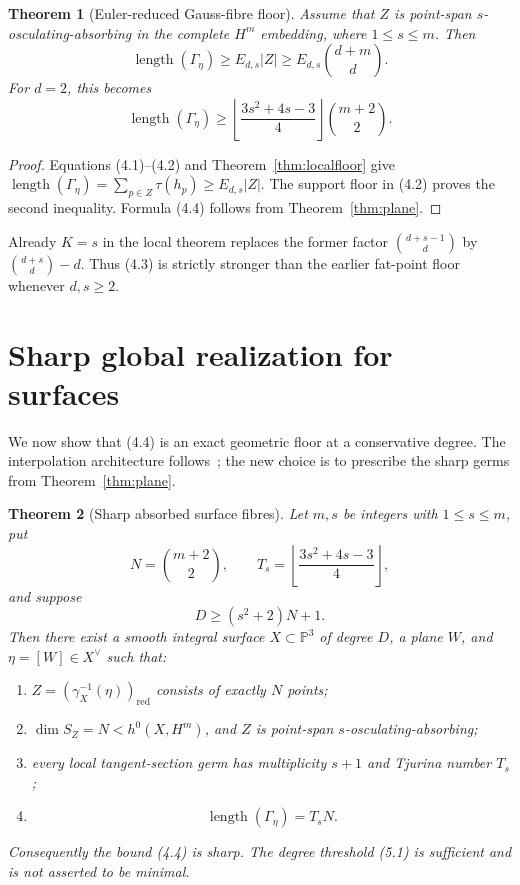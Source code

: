 \documentclass[11pt,a4paper]{article}
\newtheorem{theorem}{Theorem}[section]
\theoremstyle{definition}
\numberwithin{equation}{section}
\newcommand{\PP}{\mathbb P}
\newcommand{\length}{\operatorname{length}}
\begin{document}
\begin{theorem}[Euler-reduced Gauss-fibre floor]\label{thm:gauss}
Assume that \(Z\) is point-span \(s\)-osculating-absorbing in the complete
\(H^m\) embedding, where \(1\le s\le m\).  Then
\begin{equation}
 \length(\Gamma_\eta)
 \ge E_{d,s}|Z|
 \ge E_{d,s}\binom{d+m}{d}.
\end{equation}
For \(d=2\), this becomes
\begin{equation}
 \length(\Gamma_\eta)\ge
 \left\lfloor\frac{3s^2+4s-3}{4}\right\rfloor
 \binom{m+2}{2}.
\end{equation}
\end{theorem}

\begin{proof}
Equations (4.1)--(4.2) and Theorem~\ref{thm:localfloor} give
\(\length(\Gamma_\eta)=\sum_{p\in Z}\tau(h_p)\ge E_{d,s}|Z|\).
The support floor in (4.2) proves the second inequality.  Formula (4.4)
follows from Theorem~\ref{thm:plane}.
\end{proof}

Already \(K=s\) in the local theorem replaces the former factor
\(\binom{d+s-1}{d}\) by \(\binom{d+s}{d}-d\).  Thus (4.3) is strictly
stronger than the earlier fat-point floor whenever \(d,s\ge2\).

\section{Sharp global realization for surfaces}

We now show that (4.4) is an exact geometric floor at a conservative degree.
The interpolation architecture follows~\cite{ErikssonGauss2026}; the new
choice is to prescribe the sharp germs from Theorem~\ref{thm:plane}.

\begin{theorem}[Sharp absorbed surface fibres]\label{thm:realization}
Let \(m,s\) be integers with \(1\le s\le m\), put
\[
 N=\binom{m+2}{2},
 \qquad T_s=\left\lfloor\frac{3s^2+4s-3}{4}\right\rfloor,
\]
and suppose
\begin{equation}
 D\ge(s^2+2)N+1.
\end{equation}
Then there exist a smooth integral surface
\(X\subset\PP^3\) of degree \(D\), a plane \(W\), and
\(\eta=[W]\in X^\vee\) such that:
\begin{enumerate}
\item \(Z=(\gamma_X^{-1}(\eta))_{\mathrm{red}}\) consists of exactly \(N\)
      points;
\item \(\dim S_Z=N<h^0(X,H^m)\), and \(Z\) is point-span
      \(s\)-osculating-absorbing;
\item every local tangent-section germ has multiplicity \(s+1\) and
      Tjurina number \(T_s\);
\item
\[
 \length(\Gamma_\eta)=T_sN.
\]
\end{enumerate}
Consequently the bound (4.4) is sharp.  The degree threshold (5.1) is
sufficient and is not asserted to be minimal.
\end{theorem}
\end{document}
